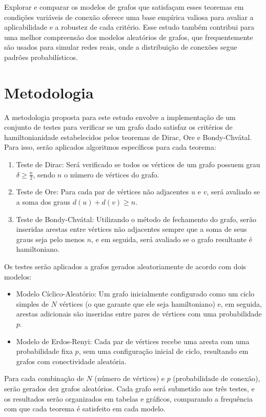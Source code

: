 \documentclass[12pt, openright, oneside, a4paper, chapter=TITLE, section=TITLE, subsection=TITLE, subsubsection=TITLE, brazil]{abntex2}
\begin{document}
Explorar e comparar os modelos de grafos que satisfaçam esses teoremas em condições variáveis de conexão oferece uma base empírica valiosa para avaliar a aplicabilidade e a robustez de cada critério. Esse estudo também contribui para uma melhor compreensão dos modelos aleatórios de grafos, que frequentemente são usados para simular redes reais, onde a distribuição de conexões segue padrões probabilísticos.

\section{Metodologia}
A metodologia proposta para este estudo envolve a implementação de um conjunto de testes para verificar se um grafo dado satisfaz os critérios de hamiltonianidade estabelecidos pelos teoremas de Dirac, Ore e Bondy-Chvátal. Para isso, serão aplicados algoritmos específicos para cada teorema:
\begin{enumerate}
    \item Teste de Dirac: Será verificado se todos os vértices de um grafo possuem grau $\delta \geq \frac{n}{2}$, sendo $n$ o número de vértices do grafo.
    \item Teste de Ore: Para cada par de vértices não adjacentes $u$ e $v$, será avaliado se a soma dos graus $d(u) + d(v) \geq n$.
    \item Teste de Bondy-Chvátal: Utilizando o método de fechamento do grafo, serão inseridas arestas entre vértices não adjacentes sempre que a soma de seus graus seja pelo menos $n$, e em seguida, será avaliado se o grafo resultante é hamiltoniano.
\end{enumerate}
Os testes serão aplicados a grafos gerados aleatoriamente de acordo com dois modelos:
\begin{itemize}
    \item Modelo Cíclico-Aleatório: Um grafo inicialmente configurado como um ciclo simples de $N$ vértices (o que garante que ele seja hamiltoniano) e, em seguida, arestas adicionais são inseridas entre pares de vértices com uma probabilidade $p$.
    \item Modelo de Erdos-Renyi: Cada par de vértices recebe uma aresta com uma probabilidade fixa $p$, sem uma configuração inicial de ciclo, resultando em grafos com conectividade aleatória.
\end{itemize}
Para cada combinação de $N$ (número de vértices) e $p$ (probabilidade de conexão), serão gerados dez grafos aleatórios. Cada grafo será submetido aos três testes, e os resultados serão organizados em tabelas e gráficos, comparando a frequência com que cada teorema é satisfeito em cada modelo.
\end{document}
